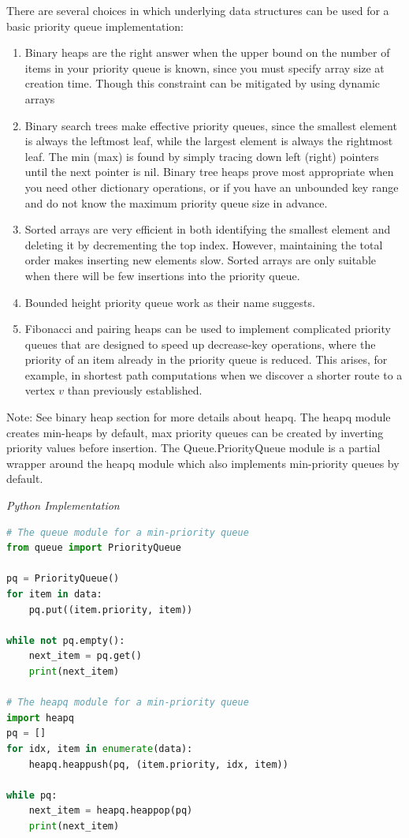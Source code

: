 \documentclass{article}
\begin{document}
    There are several choices in which underlying data structures can be used for a basic priority queue implementation:
    \begin{enumerate}
        \item Binary heaps are the right answer when the upper bound on the number of items in your priority queue is known, since you must specify array size at creation time. Though this constraint can be mitigated by using dynamic arrays
    
        \item Binary search trees make effective priority queues, since the smallest element is always the leftmost leaf, while the largest element is always the rightmost leaf. The min (max) is found by simply tracing down left (right) pointers until the next pointer is nil. Binary tree heaps prove most appropriate when you need other dictionary operations, or if you have an unbounded key range and do not know the maximum priority queue size in advance.
        
        \item Sorted arrays are very efficient in both identifying the smallest element and deleting it by decrementing the top index. However, maintaining the total order makes inserting new elements slow. Sorted arrays are only suitable when there will be few insertions into the priority queue.
        
        \item Bounded height priority queue work as their name suggests.
        
        \item Fibonacci and pairing heaps can be used to implement complicated priority queues that are designed to speed up decrease-key operations, where the priority of an item already in the priority queue is reduced. This arises, for example, in shortest path computations when we discover a shorter route to a vertex $v$ than previously established.
    \end{enumerate}
    
    Note: See binary heap section for more details about heapq. The heapq module creates min-heaps by default, max priority queues can be created by inverting priority values before insertion. The Queue.PriorityQueue module is a partial wrapper around the heapq module which also implements min-priority queues by default. 
    
\vspace{8pt} \emph{Python Implementation}
\begin{lstlisting}[language=Python]
# The queue module for a min-priority queue
from queue import PriorityQueue

pq = PriorityQueue()
for item in data:
    pq.put((item.priority, item))

while not pq.empty():
    next_item = pq.get()
    print(next_item)
    
# The heapq module for a min-priority queue
import heapq
pq = []
for idx, item in enumerate(data):
    heapq.heappush(pq, (item.priority, idx, item))
    
while pq:
    next_item = heapq.heappop(pq)
    print(next_item)
\end{lstlisting}
\end{document}
